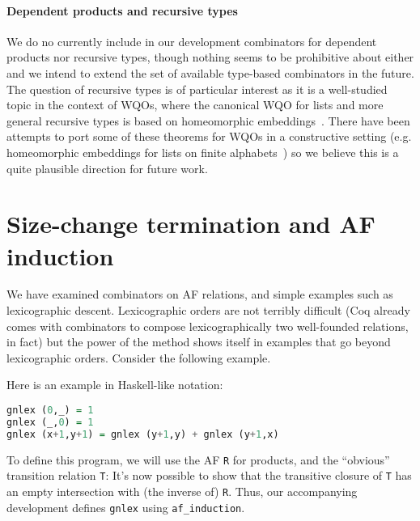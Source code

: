 \documentclass{llncs}
\begin{document}
\paragraph{Dependent products and recursive types}
We do no currently include in our development combinators for dependent products
nor recursive types, though nothing seems to be prohibitive about either and we 
intend to extend the set of available type-based combinators in the future. The 
question of recursive types is of particular interest as it is a well-studied topic
in the context of WQOs, where the canonical WQO for lists and more general recursive 
types is based on homeomorphic embeddings~\cite{OnWellQuasiOrderingFiniteTrees,TreeTheorem}. 
There have been attempts to port some of these theorems for WQOs in a constructive setting 
(e.g. homeomorphic embeddings for lists on finite alphabets~\cite{berghofer-higman,Seisenberger}) 
so we believe this is a quite plausible direction for future work. 

\section{Size-change termination and AF induction}\label{sect:af-in-practice}

We have examined combinators on AF relations, and simple examples such as lexicographic
descent. Lexicographic orders are not terribly difficult (Coq already comes with 
combinators to compose lexicographically two well-founded relations, in fact) but the power of 
the method shows itself in examples that go beyond lexicographic orders. Consider 
the following example.

\vspace{5pt}\begin{example}
Here is an example in Haskell-like notation:
\begin{lstlisting}[language=hs]
gnlex (0,_) = 1 
gnlex (_,0) = 1
gnlex (x+1,y+1) = gnlex (y+1,y) + gnlex (y+1,x)
\end{lstlisting}
To define this program, we will use the AF \lstinline|R| for products, and the 
``obvious'' transition relation \lstinline|T|:
It's now possible to show that the transitive closure of \lstinline|T| has 
an empty intersection with (the inverse of) \lstinline|R|. Thus, our accompanying development 
defines \lstinline|gnlex| using \lstinline|af_induction|. 
\end{example}

\end{document}
